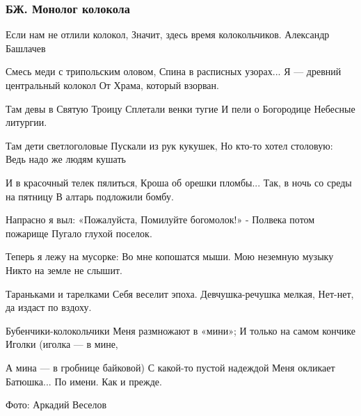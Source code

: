  
 
 

\subsubsection{БЖ. Монолог колокола}

Если нам не отлили колокол,
Значит, здесь время колокольчиков.
Александр Башлачев

Смесь меди с трипольским оловом,
Спина в расписных узорах...
Я — древний центральный колокол
От Храма, который взорван.

Там девы в Святую Троицу
Сплетали венки тугие
И пели о Богородице
Небесные литургии.

Там дети светлоголовые
Пускали из рук кукушек,
Но кто-то хотел столовую:
Ведь надо же людям кушать

И в красочный телек пялиться,
Кроша об орешки пломбы...
Так, в ночь со среды на пятницу
В алтарь подложили бомбу.

Напрасно я выл: «Пожалуйста,
Помилуйте богомолок!» -
Полвека потом пожарище
Пугало глухой поселок.

Теперь я лежу на мусорке:
Во мне копошатся мыши.
Мою неземную музыку
Никто на земле не слышит.

Тараньками и тарелками
Себя веселит эпоха.
Девчушка-речушка мелкая,
Нет-нет, да издаст по вздоху.

Бубенчики-колокольчики
Меня размножают в «мини»;
И только на самом кончике
Иголки (иголка — в мине,

А мина — в гробнице байковой)
С какой-то пустой надеждой
Меня окликает Батюшка...
По имени.
Как и прежде.

Фото: Аркадий Веселов
